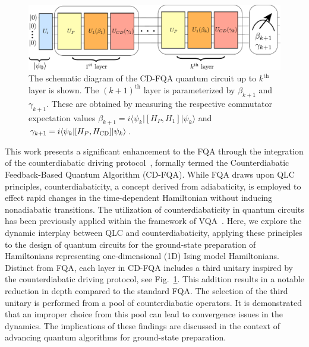 \documentclass[twocolumn,aps,superscriptaddress,floatfix,longbibliography]{revtex4-2}
\begin{document}
\begin{figure}
\centering
\includegraphics[scale=0.4]{Circuit.pdf}
\caption{
   The schematic diagram of the CD-FQA quantum circuit up to
   $k^{\text{th}}$ layer is shown. The  $(k+1)^{\text{th}}$
   layer is parameterized by $\beta_{k+1}$ and $\gamma_{k+1}$.
   These are obtained by measuring the respective 
   commutator expectation values %
   $\beta_{k+1} = i\langle \psi_{k}|[H_{P}, H_{1} ]|\psi_{k}\rangle$ and
   $\gamma_{k+1} = i\langle \psi_{k}|[H_{P}, H_{\rm CD}]|\psi_{k}\rangle$.}
\label{fig:1}
\end{figure}

This work presents a significant enhancement to the FQA through
the integration of the counterdiabatic driving
protocol~\cite{demirplak2003adiabatic}, formally termed the
Counterdiabatic Feedback-Based Quantum Algorithm (CD-FQA). While
FQA draws upon QLC principles, counterdiabaticity, a concept
derived from adiabaticity, is employed to effect rapid changes
in the time-dependent Hamiltonian without inducing nonadiabatic
transitions. The utilization of counterdiabaticity in quantum
circuits has been previously applied within the framework of VQA~\cite{yao2021reinforcement,chandarana2022digitized}. Here, we
explore the dynamic interplay between QLC and
counterdiabaticity, applying these principles to the design of
quantum circuits for the ground-state preparation of
Hamiltonians representing one-dimensional (1D) Ising model
Hamiltonians. Distinct from FQA, each layer in CD-FQA includes a
third unitary inspired by the counterdiabatic driving protocol, see Fig.~\ref{fig:1}.
This addition results in a notable reduction in depth compared
to the standard FQA. The selection of the third unitary is
performed from a pool of counterdiabatic operators. It is
demonstrated that an improper choice from this pool can lead to
convergence issues in the dynamics. The implications of these
findings are discussed in the context of advancing quantum
algorithms for ground-state preparation.
\end{document}

